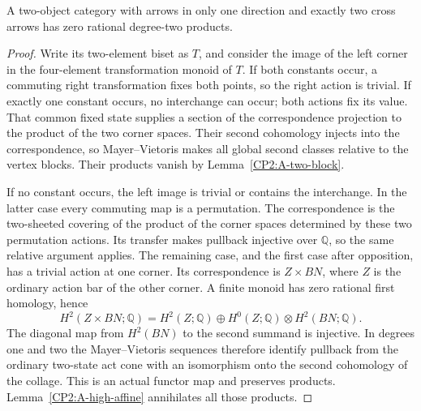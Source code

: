 \begin{lemma}
\label{CP2:A-high-two-cross}
A two-object category with arrows in only one direction and
exactly two cross arrows has zero rational degree-two products.
\end{lemma}
\begin{proof}
Write its two-element biset as $T$, and consider the image of
the left corner in the four-element transformation monoid of
$T$.  If both constants occur, a commuting right transformation
fixes both points, so the right action is trivial.  If exactly
one constant occurs, no interchange can occur; both actions
fix its value.  That common fixed state supplies a section of
the correspondence projection to the product of the two corner
spaces.  Their second cohomology injects into the correspondence,
so Mayer--Vietoris makes all global second classes relative
to the vertex blocks.  Their products vanish by
Lemma~\ref{CP2:A-two-block}.

If no constant occurs, the left image is trivial or contains
the interchange.  In the latter case every commuting map is
a permutation.  The correspondence is the two-sheeted covering
of the product of the corner spaces determined by these two
permutation actions.  Its transfer makes pullback injective
over $\mathbb Q$, so the same relative argument applies.
The remaining case, and the first case after opposition, has
a trivial action at one corner.  Its correspondence is
$Z\times BN$, where $Z$ is the ordinary action bar of the
other corner.  A finite monoid has zero rational first
homology, hence
\[
 H^2(Z\times BN;\mathbb Q)
  =H^2(Z;\mathbb Q)\oplus
     H^0(Z;\mathbb Q)\otimes H^2(BN;\mathbb Q).
\]
The diagonal map from $H^2(BN)$ to the second summand is
injective.  In degrees one and two the Mayer--Vietoris
sequences therefore identify pullback from the ordinary
two-state act cone with an isomorphism onto the second
cohomology of the collage.  This is an actual functor map
and preserves products.  Lemma~\ref{CP2:A-high-affine}
annihilates all those products.
\end{proof}

